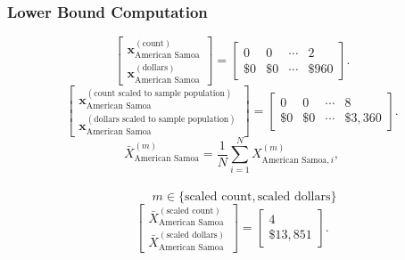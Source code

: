 \subsubsection{Lower Bound Computation}
\[
\begin{bmatrix}
\mathbf{x}_{\text{American Samoa}}^{(\text{count})}\\
\mathbf{x}_{\text{American Samoa}}^{(\text{dollars})}
\end{bmatrix}
=
\begin{bmatrix}
0 & 0 & \cdots & 2\\
\$0 &\$0 & \cdots &\$960 
\end{bmatrix}.
\]
\[
\begin{bmatrix}
\mathbf{x}_{\text{American Samoa}}^{(\text{count scaled to sample population})}\\
\mathbf{x}_{\text{American Samoa}}^{(\text{dollars scaled to sample population})}
\end{bmatrix}
=
\begin{bmatrix}
0 & 0 & \cdots & 8\\
\$0 & \$0 & \cdots &\$3{,}360
\end{bmatrix}.
\]
  \[
\bar{X}_{\text{American Samoa}}^{(m)}
= \frac{1}{N}\sum_{i=1}^{N} X_{\text{American Samoa},i}^{(m)},
\]
\\
\[
\qquad
m \in \{\text{scaled count},\text{scaled dollars}\}
\]
\[
\begin{bmatrix}
\bar{X}_{\text{American Samoa}}^{(\text{scaled count})}\\
\bar{X}_{\text{American Samoa}}^{(\text{scaled dollars})}
\end{bmatrix}
=
\begin{bmatrix}
4\\
\$13{,}851
\end{bmatrix}.
\]
